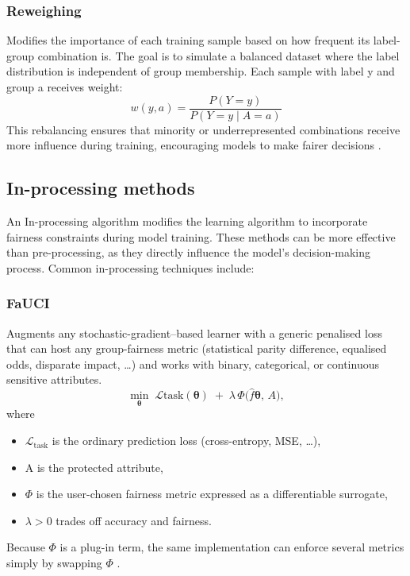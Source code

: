 \documentclass[12pt,a4paper,openright,twoside]{book}
\begin{document}
\subsubsection{Reweighing} Modifies the importance of each training sample based on how frequent its label-group combination is. The goal is to simulate a balanced dataset where the label distribution is independent of group membership.
Each sample with label y and group a receives weight:
\begin{equation}
    w(y, a) = \frac{P(Y = y)}{P(Y = y \mid A = a)}
\end{equation}
This rebalancing ensures that minority or underrepresented combinations receive more influence during training, encouraging models to make fairer decisions \cite{8907b030dc7644cabfab035645f9b9da}.


\subsection{In-processing methods} 
An In-processing algorithm modifies the learning algorithm to incorporate fairness constraints during model training. These methods can be more effective than pre-processing, as they directly influence the model's decision-making process. Common in-processing techniques include:
\subsubsection{FaUCI} Augments any stochastic-gradient–based learner with a generic penalised loss that can host any group-fairness metric (statistical parity difference, equalised odds, disparate impact, …) and works with binary, categorical, or continuous sensitive attributes.
\begin{equation}
    \min_{\boldsymbol\theta}
    \; \mathcal{L}{\text{task}}(\boldsymbol\theta)
    \;+\;
    \lambda\,\Phi\bigl(\widehat{f}{\!\boldsymbol\theta},\,A\bigr),
\end{equation}
where
\begin{itemize}
    \item \begin{math}\mathcal{L}_{\text{task}}\end{math} is the ordinary prediction loss (cross-entropy, MSE, …),
    \item A is the protected attribute,
    \item \begin{math}\Phi\end{math} is the user-chosen fairness metric expressed as a differentiable surrogate,
    \item \begin{math}\lambda>0\end{math} trades off accuracy and fairness.
\end{itemize}
Because \begin{math}\Phi\end{math} is a plug-in term, the same implementation can enforce several metrics simply by swapping \begin{math}\Phi\end{math} \cite{fauci-aequitas2024}.
\end{document}
